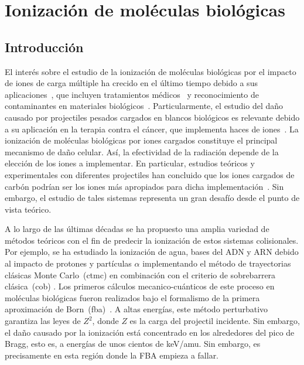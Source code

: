\chapter{Ionización de moléculas biológicas}
\label{chap:ionmol}

\section{Introducción}

El interés sobre el estudio de la ionización de moléculas biológicas por 
el impacto de iones de carga múltiple ha crecido en el último tiempo 
debido a sus aplicaciones~\cite{Liamsuwan:13}, que incluyen tratamientos 
médicos~\cite{Mohamad:17,Baskar:12,Denifl:11,Solov:09} y reconocimiento 
de contaminantes en materiales biológicos~\cite{Gafur:18,FerrazDias:13}. 
Particularmente, el estudio del daño causado por projectiles pesados 
cargados en blancos biológicos es relevante debido a su aplicación en la 
terapia contra el cáncer, que implementa haces de iones~\cite{Baskar:12}. 
La ionización de moléculas biológicas por iones cargados constituye el 
principal mecanismo de daño celular. Así, la efectividad de la radiación 
depende de la elección de los iones a implementar. En particular, 
estudios teóricos y experimentales con diferentes projectiles han 
concluido que los iones cargados de carbón podrían ser los iones más 
apropiados para dicha implementación~\cite{Mohamad:17}. Sin embargo, el 
estudio de tales sistemas representa un gran desafío desde el punto de 
vista teórico. 

A lo largo de las últimas décadas se ha propuesto una amplia variedad de 
métodos teóricos con el fin de predecir la ionización de estos sistemas 
colisionales. Por ejemplo, se ha estudiado la ionización de agua, bases 
del ADN y ARN debido al impacto de protones y partículas $\alpha$ 
implementando el método de trayectorias clásicas Monte Carlo~(\acs{ctmc}) 
en combinación con el criterio de sobrebarrera clásica~(\acs{cob}) 
\cite{Abbas:08,Lekadir:09}. Los primeros cálculos mecanico-cuánticos de 
este proceso en moléculas biológicas fueron realizados bajo el formalismo 
de la primera aproximación de Born~(\acs{fba})~\cite{DalCappello:08,
Champion:10}. A altas energías, este método perturbativo garantiza las 
leyes de $Z^2$, donde $Z$ es la carga del projectil incidente. Sin 
embargo, el daño causado por la ionización está concentrado en los 
alrededores del pico de Bragg, esto es, a energías de unos cientos de 
keV/amu. Sin embargo, es precisamente en esta región donde la FBA empieza 
a fallar. 


